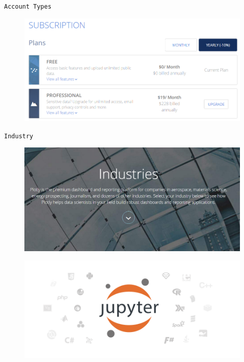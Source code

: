 \documentclass{beamer}
\begin{document}
\begin{frame}
	\large
	\texttt{Account Types}
	\begin{figure}
		\centering
		\includegraphics[width=01.1\linewidth]{plotlysubscription}
	\end{figure}
	
\end{frame}
\begin{frame}
	\large
	\texttt{Industry}
	\begin{figure}
		\centering
		\includegraphics[width=01.1\linewidth]{plotlyindustry}
	\end{figure}
	
\end{frame}


\begin{frame}
	\begin{figure}
\centering
\includegraphics[width=1.3\linewidth]{jupyter}
\end{figure}
\end{frame}
\end{document}
